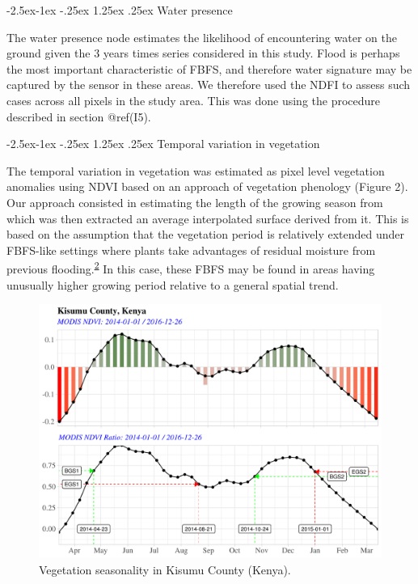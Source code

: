 \documentclass[12pt,oneside]{article}
\makeatletter
\renewcommand\paragraph{\@startsection{paragraph}{4}{\z@}%
            {-2.5ex\@plus -1ex \@minus -.25ex}%
            {1.25ex \@plus .25ex}%
            {\normalfont\normalsize\bfseries}}
\makeatother
\begin{document}
\hypertarget{I527}{%
\paragraph{Water presence}\label{I527}}

The water presence node estimates the likelihood of encountering water on the ground given the 3 years times series considered in this study. Flood is perhaps the most important characteristic of FBFS, and therefore water signature may be captured by the sensor in these areas. We therefore used the NDFI to assess such cases across all pixels in the study area. This was done using the procedure described in section @ref(I5).

\hypertarget{I528}{%
\paragraph{Temporal variation in vegetation}\label{I528}}

The temporal variation in vegetation was estimated as pixel level vegetation anomalies using NDVI based on an approach of vegetation phenology (Figure 2). Our approach consisted in estimating the length of the growing season from which was then extracted an average interpolated surface derived from it. This is based on the assumption that the vegetation period is relatively extended under FBFS-like settings where plants take advantages of residual moisture from previous flooding.\textsuperscript{\protect\hyperlink{ref-VanSteenbergen_et_al_2010}{2}} In this case, these FBFS may be found in areas having unusually higher growing period relative to a general spatial trend.

\begin{figure}
\includegraphics[width=1\linewidth]{figures/Mapping_FBFS_vegetation_seasonality} \caption{Vegetation seasonality in Kisumu County (Kenya).}\label{fig:fig2}
\end{figure}
\end{document}
